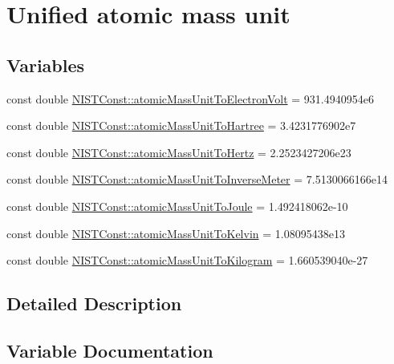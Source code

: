 \hypertarget{group___atomic_mass_unit}{}\section{Unified atomic mass unit}
\label{group___atomic_mass_unit}
\subsection*{Variables}
\begin{DoxyCompactItemize}
\item 
const double \hyperlink{group___atomic_mass_unit_ga4a5d912289e6a828a25e9e7ae3385b0d}{N\+I\+S\+T\+Const\+::atomic\+Mass\+Unit\+To\+Electron\+Volt} = 931.\+4940954e6
\item 
const double \hyperlink{group___atomic_mass_unit_ga8a6b352e1a13d0cbbc0f36f650e2c682}{N\+I\+S\+T\+Const\+::atomic\+Mass\+Unit\+To\+Hartree} = 3.\+4231776902e7
\item 
const double \hyperlink{group___atomic_mass_unit_gad284f1982f0182e1e4a90e0bff793af9}{N\+I\+S\+T\+Const\+::atomic\+Mass\+Unit\+To\+Hertz} = 2.\+2523427206e23
\item 
const double \hyperlink{group___atomic_mass_unit_gae1f5517810a5df9365d26887c04ada40}{N\+I\+S\+T\+Const\+::atomic\+Mass\+Unit\+To\+Inverse\+Meter} = 7.\+5130066166e14
\item 
const double \hyperlink{group___atomic_mass_unit_gaea7c1916a35df8824ac6a67be3f65f33}{N\+I\+S\+T\+Const\+::atomic\+Mass\+Unit\+To\+Joule} = 1.\+492418062e-\/10
\item 
const double \hyperlink{group___atomic_mass_unit_gaf9c3a2dfd69d4e74cee3361abd7d7ecf}{N\+I\+S\+T\+Const\+::atomic\+Mass\+Unit\+To\+Kelvin} = 1.\+08095438e13
\item 
const double \hyperlink{group___atomic_mass_unit_gafdd40d93803d15e1ff887dc12c49ca99}{N\+I\+S\+T\+Const\+::atomic\+Mass\+Unit\+To\+Kilogram} = 1.\+660539040e-\/27
\end{DoxyCompactItemize}


\subsection{Detailed Description}


\subsection{Variable Documentation}
\mbox{\label{group___atomic_mass_unit_ga4a5d912289e6a828a25e9e7ae3385b0d}} 
